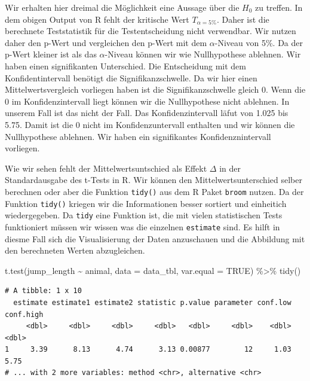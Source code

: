 \documentclass[
  letterpaper,
]{scrbook}
\newenvironment{Shaded}{\begin{snugshade}}{\end{snugshade}}
\newcommand{\AttributeTok}[1]{\textcolor[rgb]{0.40,0.45,0.13}{#1}}
\newcommand{\ConstantTok}[1]{\textcolor[rgb]{0.56,0.35,0.01}{#1}}
\newcommand{\FunctionTok}[1]{\textcolor[rgb]{0.28,0.35,0.67}{#1}}
\newcommand{\NormalTok}[1]{\textcolor[rgb]{0.00,0.23,0.31}{#1}}
\newcommand{\SpecialCharTok}[1]{\textcolor[rgb]{0.37,0.37,0.37}{#1}}
\begin{document}
Wir erhalten hier dreimal die Möglichkeit eine Aussage über die \(H_0\)
zu treffen. In dem obigen Output von R fehlt der kritische Wert
\(T_{\alpha = 5\%}\). Daher ist die berechnete Teststatistik für die
Testentscheidung nicht verwendbar. Wir nutzen daher den p-Wert und
vergleichen den p-Wert mit dem \(\alpha\)-Niveau von 5\%. Da der p-Wert
kleiner ist als das \(\alpha\)-Niveau können wir wie Nullhypothese
ablehnen. Wir haben einen signifikanten Unterschied. Die Entscheidung
mit dem Konfidentintervall benötigt die Signifikanzschwelle. Da wir hier
einen Mittelwertsvergleich vorliegen haben ist die Signifikanzschwelle
gleich 0. Wenn die 0 im Konfidenzintervall liegt können wir die
Nullhypothese nicht ablehnen. In unserem Fall ist das nicht der Fall.
Das Konfidenzintervall läfut von 1.025 bis 5.75. Damit ist die 0 nicht
im Konfidenzuntervall enthalten und wir können die Nullhypothese
ablehnen. Wir haben ein signifikantes Konfidenznintervall vorliegen.

Wie wir sehen fehlt der Mittelwertsuntschied als Effekt \(\Delta\) in
der Standardausgabe des t-Tests in R. Wir können den
Mittelwertsunterschied selber berechnen oder aber die Funktion
\texttt{tidy()} aus dem R Paket \texttt{broom} nutzen. Da der Funktion
\texttt{tidy()} kriegen wir die Informationen besser sortiert und
einheitich wiedergegeben. Da \texttt{tidy} eine Funktion ist, die mit
vielen statistischen Tests funktioniert müssen wir wissen was die
einzelnen \texttt{estimate} sind. Es hilft in diesme Fall sich die
Visualisierung der Daten anzuschauen und die Abbildung mit den
berechneten Werten abzugleichen.

\begin{Shaded}
\begin{Highlighting}[]
\FunctionTok{t.test}\NormalTok{(jump\_length }\SpecialCharTok{\textasciitilde{}}\NormalTok{ animal, }
       \AttributeTok{data =}\NormalTok{ data\_tbl, }\AttributeTok{var.equal =} \ConstantTok{TRUE}\NormalTok{) }\SpecialCharTok{\%\textgreater{}\%} 
  \FunctionTok{tidy}\NormalTok{() }
\end{Highlighting}
\end{Shaded}

\begin{verbatim}
# A tibble: 1 x 10
  estimate estimate1 estimate2 statistic p.value parameter conf.low conf.high
     <dbl>     <dbl>     <dbl>     <dbl>   <dbl>     <dbl>    <dbl>     <dbl>
1     3.39      8.13      4.74      3.13 0.00877        12     1.03      5.75
# ... with 2 more variables: method <chr>, alternative <chr>
\end{verbatim}
\end{document}
